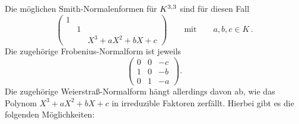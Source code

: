 Die möglichen Smith-Normalenformen für $\matrices{3}{K}$ sind für diesen Fall
\[
  \begin{pmatrix}
    1 &   &                       \\
      & 1 &                       \\
      &   & X^3 + a X^2 + b X + c
  \end{pmatrix}
  \qquad\text{mit}\qquad
  a, b, c \in K \,.
\]
Die zugehörige Frobenius-Normalform ist jeweils
\[
  \begin{pmatrix}
    0 & 0 & -c  \\
    1 & 0 & -b  \\
    0 & 1 & -a
  \end{pmatrix}.
\]
Die zugehörige Weierstraß-Normalform hängt allerdings davon ab, wie das Polynom $X^3 + a X^2 + b X + c$ in irreduzible Faktoren zerfällt.
Hierbei gibt es die folgenden Möglichkeiten:

